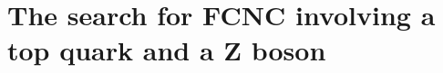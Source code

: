 \chapter{The search for FCNC involving a top quark and a Z boson}

\begin{comment}
\section{Model assumptions}
\section{Data and simulation}
\subsection{Standard Model Background simulation}





The physics analysis
`Measurement of the top pair-production in association with a W or Z boson in pp collisions at 13 TeV`
(CADI entry TOP-17-005)
will be presented for approval at the physics meeting on Thu, May 4, 2017:

https://indico.cern.ch/event/635522/#12-top-17-005-measurement-of-t

The corresponding documentation can be found on CADI at:
http://cms.cern.ch/iCMS/analysisadmin/cadi?ancode=TOP-17-005


\subsection{FCNC signal simulation}
In this thesis, two scenarios are being studied: one being the top-up interactions and the second one being top-charm interactions. For a given flavour of light quark \Pquark, all left-handed chiral parameters were set to zero and all right-handed set to one

\end{comment}
